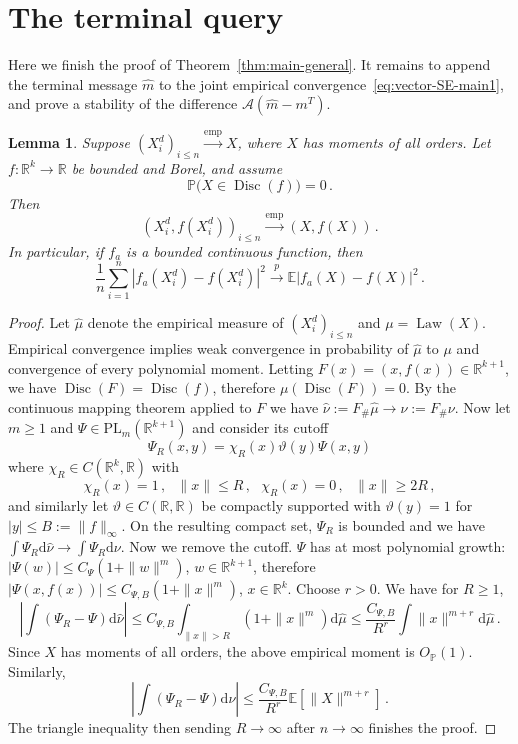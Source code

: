 \documentclass[11pt]{article}
\newtheorem{lemma}[theorem]{Lemma}
\theoremstyle{definition}
\theoremstyle{remark}
\numberwithin{equation}{section}
\numberwithin{theorem}{section}
\newcommand{\R}{\mathbb R}
\newcommand{\E}{\mathbb E}
\newcommand{\Prob}{\mathbb P}
\newcommand{\cA}{\mathcal A}
\newcommand{\rmd}{\mathrm{d}}
\begin{document}



\section{The terminal query}
\label{sec:adapted-terminal-query}
Here we finish the proof of Theorem~\ref{thm:main-general}. It remains to append the terminal message $\widehat m$ to the joint empirical convergence~\eqref{eq:vector-SE-main1}, and prove a stability of the difference $\cA (\widehat m - m^T)$.  

\begin{lemma}
\label{lem:ae-empirical-transform}
Suppose $(X_i^d)_{i\le n}\xrightarrow{\mathrm{emp}}X$, where $X$
has moments of all orders. Let $f:\R^k\to\R$ be bounded and Borel,
and assume
\[
 \Prob\bigl(X\in\operatorname{Disc}(f)\bigr)=0\,.
\]
Then
\[
 (X_i^d,f(X_i^d))_{i\le n}
 \xrightarrow{\mathrm{emp}}(X,f(X))\,.
\]
In particular, if $f_a$ is a bounded continuous function, then 
\[
 \frac1n\sum_{i=1}^n
 |f_a(X_i^d)-f(X_i^d)|^2
 \xrightarrow{p}
 \E|f_a(X)-f(X)|^2\,.
\]
\end{lemma}

\begin{proof}
Let $\widehat \mu$ denote the empirical measure of $(X_i^d)_{i\le n}$ and $\mu = \operatorname{Law}(X)$. Empirical convergence implies weak convergence in probability of $\widehat{\mu}$ to $\mu$ and convergence of every polynomial moment.
Letting $F(x) = (x,f(x)) \in \R^{k+1}$, we have $\operatorname{Disc}(F) = \operatorname{Disc}(f)$, therefore $\mu(\operatorname{Disc}(F))=0$. By the continuous mapping theorem applied to $F$ we have  
 $\widehat \nu := F_{\#}\widehat\mu\to \nu := F_\# \nu$.  
%
Now let $m\ge1$ and $\Psi\in\mathrm{PL}_m(\mathbb R^{k+1})$ and consider its cutoff 
\[\Psi_R(x,y) = \chi_R(x)\vartheta(y)\Psi(x,y)\] 
where $\chi_R \in C(\R^k,\R)$ with 
\[\chi_R(x)=1\,,~~~ \|x\|\le R\,,~~~  \chi_R(x)=0\,,~~~ \|x\|\ge 2R\,,\]
and similarly let $\vartheta \in C(\R,\R)$ be compactly supported with $\vartheta(y)=1$ for $|y|\le B := \|f\|_{\infty}$.
On the resulting compact set, $\Psi_R$ is bounded and
we have $\int \Psi_R \mathrm{d}\widehat \nu \to \int \Psi_R \mathrm{d} \nu $.
Now we remove the cutoff. 
$\Psi$ has at most polynomial growth: $|\Psi(w)|\le C_{\Psi}(1+\|w\|^m)$, $w \in \R^{k+1}$, therefore $|\Psi(x,f(x))|\le C_{\Psi,B}(1+\|x\|^m)$, $x\in\R^k$. Choose $r>0$. We have for $R \ge 1$, 
\[
\left|\int (\Psi_R - \Psi)\rmd \widehat \nu\right| \le C_{\Psi,B}\int_{\|x\|>R} (1+\|x\|^m) \rmd \widehat\mu
\le \frac{C_{\Psi,B}}{R^{r}}\int \|x\|^{m+r}\rmd \widehat\mu\,.
\]
Since $X$ has moments of all orders, the above empirical moment is $O_{\Prob}(1)$.  
Similarly,
\[\left|\int (\Psi_R - \Psi)\rmd \nu\right| \le \frac{C_{\Psi,B}}{R^{r}}\E[\|X\|^{m+r}]\,.\] 
The triangle inequality then sending $R \to \infty$ after $n\to \infty$ finishes the proof.
\end{proof}
\end{document}
